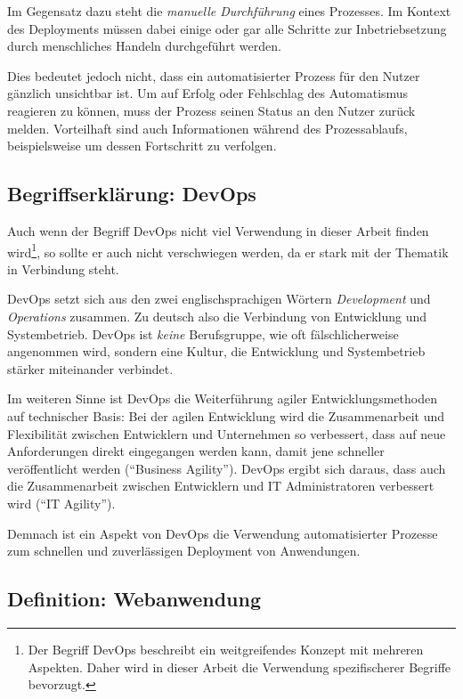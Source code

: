 Im Gegensatz dazu steht die \emph{manuelle Durchführung} eines Prozesses. Im Kontext des Deployments müssen dabei einige oder gar alle Schritte zur Inbetriebsetzung durch menschliches Handeln durchgeführt werden.

Dies bedeutet jedoch nicht, dass ein automatisierter Prozess für den Nutzer gänzlich unsichtbar ist. Um auf Erfolg oder Fehlschlag des Automatismus reagieren zu können, muss der Prozess seinen Status an den Nutzer zurück melden. Vorteilhaft sind auch Informationen während des Prozessablaufs, beispielsweise um dessen Fortschritt zu verfolgen. \citep[10f]{Duvall2007}

\subsection{Begriffserklärung: DevOps}

Auch wenn der Begriff DevOps nicht viel Verwendung in dieser Arbeit finden wird\footnote{Der Begriff DevOps beschreibt ein weitgreifendes Konzept mit mehreren Aspekten. Daher wird in dieser Arbeit die Verwendung spezifischerer Begriffe bevorzugt.}, so sollte er auch nicht verschwiegen werden, da er stark mit der Thematik in Verbindung steht.

DevOps setzt sich aus den zwei englischsprachigen Wörtern \emph{Development} und \emph{Operations} zusammen. Zu deutsch also die Verbindung von Entwicklung und Systembetrieb. DevOps ist \emph{keine} Berufsgruppe, wie oft fälschlicherweise angenommen wird, sondern eine Kultur, die Entwicklung und Systembetrieb stärker miteinander verbindet.

Im weiteren Sinne ist DevOps die Weiterführung agiler Entwicklungsmethoden auf technischer Basis: Bei der agilen Entwicklung wird die Zusammenarbeit und Flexibilität zwischen Entwicklern und Unternehmen so verbessert, dass auf neue Anforderungen direkt eingegangen werden kann, damit jene schneller veröffentlicht werden (``Business Agility''). DevOps ergibt sich daraus, dass auch die Zusammenarbeit zwischen Entwicklern und IT Administratoren verbessert wird (``IT Agility''). \citep[4f]{Chapman2014}

Demnach ist ein Aspekt von DevOps die Verwendung automatisierter Prozesse zum schnellen und zuverlässigen Deployment von Anwendungen.

\subsection{Definition: Webanwendung}

